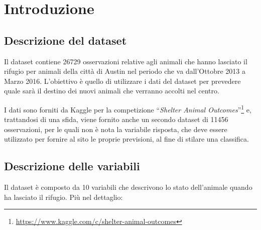 
\section{Introduzione}

\subsection{Descrizione del dataset}

Il dataset contiene 26729 osservazioni relative agli animali che hanno lasciato il rifugio per animali della città di Austin nel periodo che va dall'Ottobre 2013 a Marzo 2016.
L'obiettivo è quello di utilizzare i dati del dataset per prevedere quale sarà il destino dei nuovi animali che verranno accolti nel centro.

I dati sono forniti da Kaggle per la competizione ``\textit{Shelter Animal Outcomes}''\footnote{\url{https://www.kaggle.com/c/shelter-animal-outcomes}} e, trattandosi di una sfida, viene fornito anche un secondo dataset di 11456 osservazioni, per le quali non è nota la variabile risposta, che deve essere utilizzato per fornire al sito le proprie previsioni, al fine di stilare una classifica.

\subsection{Descrizione delle variabili}

Il dataset è composto da 10 variabili che descrivono lo stato dell'animale quando ha lasciato il rifugio.
Più nel dettaglio:

